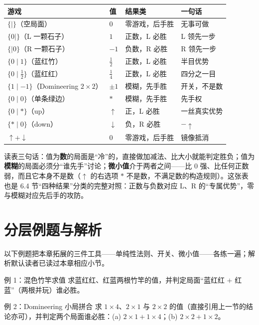 \documentclass[UTF8,a4paper,11pt,oneside,openany,fontset=fandol]{ctexbook}
\theoremstyle{definition}
\begin{document}
\begin{center}
\begin{tabular}{llll}
\toprule
游戏 & 值 & 结果类 & 一句话\\
\midrule
$\{\mid\}$（空局面） & $0$ & 零游戏，后手胜 & 无事可做\\
$\{0\mid\}$（L 一颗石子） & $1$ & 正数，L 必胜 & L 领先一步\\
$\{\mid 0\}$（R 一颗石子） & $-1$ & 负数，R 必胜 & R 领先一步\\
$\{0\mid 1\}$（蓝红竹） & $\tfrac12$ & 正数，L 必胜 & 半目优势\\
$\{0\mid \tfrac12\}$（蓝红红） & $\tfrac14$ & 正数，L 必胜 & 四分之一目\\
$\{1\mid -1\}$（Domineering $2\times2$） & $\pm1$ & 模糊，先手胜 & 开关，不是数\\
$\{0\mid 0\}$（单条绿边） & $\ast$ & 模糊，先手胜 & 先手权\\
$\{0\mid \ast\}$（up） & $\uparrow$ & 正，L 必胜 & 一丝真实优势\\
$\{\ast\mid 0\}$（down） & $\downarrow$ & 负，R 必胜 & $-\uparrow$\\
$\uparrow+\downarrow$ & $0$ & 零游戏，后手胜 & 镜像抵消\\
\bottomrule
\end{tabular}
\end{center}

读表三句话：值为\textbf{数}的局面是“冷”的，直接做加减法、比大小就能判定胜负；值为\textbf{模糊}的局面必须分“谁先手”讨论；\textbf{微小值}介于两者之间——比 $0$ 强、比任何正数弱，而且它本身不是数（$\uparrow$ 的右选项 $\ast$ 不是数，不满足数的构造规则）。这张表也是 6.4 节“四种结果”分类的完整对照：正数与负数对应 L、R 的“专属优势”，零与模糊对应先后手的攻防。

\section{分层例题与解析}
以下例题把本章拓展的三件工具——单纯性法则、开关、微小值——各练一遍；解析默认读者已读过本章相应小节。

\begin{problem}{例 1：混色竹竿求值}
求蓝红红、红蓝两根竹竿的值，并判定局面“蓝红红 $+$ 红蓝”（两根并玩）谁必胜。
\end{problem}

\begin{problem}{例 2：Domineering 小局拼合}
求 $1\times4$、$2\times1$ 与 $2\times2$ 的值（直接引用上一节的结论亦可），并判定两个局面谁必胜：(a) $2\times1+1\times4$；(b) $2\times2+1\times2$。
\end{problem}
\end{document}
